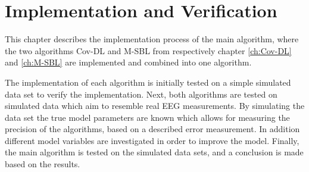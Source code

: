 \chapter{Implementation and Verification}\label{ch:implementation}

This chapter describes the implementation process of the main algorithm, where the two algorithms Cov-DL and M-SBL from respectively chapter \ref{ch:Cov-DL} and \ref{ch:M-SBL} are implemented and combined into one algorithm.

The implementation of each algorithm is initially tested on a simple simulated data set to verify the implementation. 
Next, both algorithms are tested on simulated data which aim to resemble real EEG measurements. 
By simulating the data set the true model parameters are known which allows for measuring the precision of the algorithms, based on a described error measurement. 
In addition different model variables are investigated in order to improve the model.
Finally, the main algorithm is tested on the simulated data sets, and a conclusion is made based on the results. 







   






